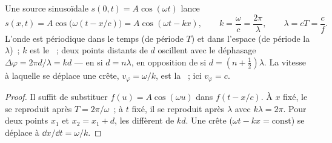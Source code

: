 \begin{proposition}\label{prop:b1:wave-propagation:sinusoidal}
Une source sinusoïdale $s(0, t) = A\cos(\omega t)$ lance
\[
s(x, t) = A\cos\!\big(\omega(t - x/c)\big) = A\cos(\omega t - kx),
\qquad k = \frac{\omega}{c} = \frac{2\pi}{\lambda},
\qquad \lambda = cT = \frac{c}{f}.
\]
L'onde est périodique dans le temps (de période $T$) et dans l'espace
(de période la \emph{} $\lambda$)~; $k$ est le
\emph{}~; deux points distants de $d$ oscillent avec le
déphasage $\Delta\varphi = 2\pi d/\lambda = kd$ --- en  si
$d = n\lambda$, en opposition de  si $d = (n + \tfrac12)\lambda$.
La vitesse à laquelle se déplace une crête, $v_\varphi = \omega/k$, est
la \emph{}~; ici $v_\varphi = c$.
\end{proposition}

\begin{proof}
Il suffit de substituer $f(u) = A\cos(\omega u)$ dans $f(t - x/c)$. À
$x$ fixé, le  se reproduit après $T = 2\pi/\omega$~; à $t$ fixé,
il se reproduit après $\lambda$ avec $k\lambda = 2\pi$. Pour deux points
$x_1$ et $x_2 = x_1 + d$, les  diffèrent de $kd$. Une crête
($\omega t - kx = \text{const}$) se déplace à $\dd x/\dd t = \omega/k$.
\end{proof}

